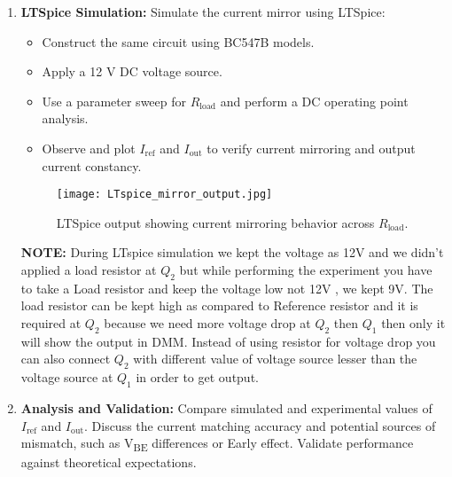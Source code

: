 \documentclass[conference]{IEEEtran}
\begin{document}
\begin{enumerate}
    \item \textbf{LTSpice Simulation:} Simulate the current mirror using LTSpice:
    \begin{itemize}
        \item Construct the same circuit using BC547B models.
        \item Apply a 12 V DC voltage source.
        \item Use a parameter sweep for $R_{\text{load}}$ and perform a DC operating point analysis.
        \item Observe and plot $I_{\text{ref}}$ and $I_{\text{out}}$ to verify current mirroring and output current constancy.
    \end{itemize}
    \begin{figure}[h]
        \centering
        \texttt{[image: LTspice\_mirror\_output.jpg]} %
        \caption{LTSpice output showing current mirroring behavior across $R_{\text{load}}$.}
        \label{fig:mirror_output}
    \end{figure}

    \textbf{NOTE:}  During LTspice simulation we kept the voltage as 12V and we didn't applied a load resistor at $Q_2$ but while performing the experiment you have to take a Load resistor and keep the voltage low not 12V , we kept 9V. The load resistor can be kept high as compared to Reference resistor and it is required at $Q_2$ because we need more voltage drop at $Q_2$ then $Q_1$ then only it will show the output in DMM. Instead of using resistor for voltage drop you can also connect $Q_2$ with different value of voltage source lesser than the voltage source at $Q_1$ in order to get output.

    \item \textbf{Analysis and Validation:} Compare simulated and experimental values of $I_{\text{ref}}$ and $I_{\text{out}}$. Discuss the current matching accuracy and potential sources of mismatch, such as V\textsubscript{BE} differences or Early effect. Validate performance against theoretical expectations.
\end{enumerate}
\end{document}
